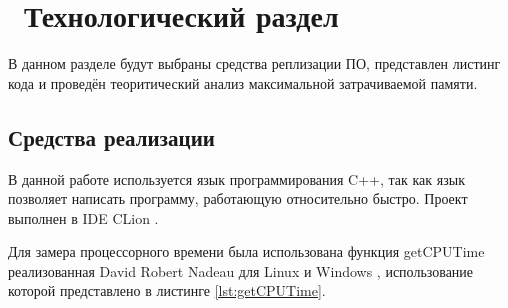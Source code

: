 \chapter{ Технологический раздел}
\label{cha:technological}

    В данном разделе будут выбраны средства реплизации ПО, представлен листинг кода
    и проведён теоритический анализ максимальной затрачиваемой памяти. 

    \section{Средства реализации}
        В данной работе используется язык программирования C++, так как
        язык позволяет написать программу, работающую относительно быстро. 
        Проект выполнен в IDE CLion \cite{visual-studio}.

        Для замера процессорного времени была использована функция getCPUTime \cite{getCPUTime}
        реализованная David Robert Nadeau для Linux и Windows , использование которой представлено в листинге \ref{lst:getCPUTime}.

